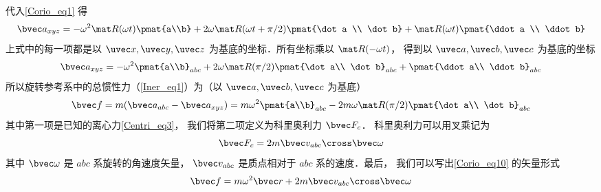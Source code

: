  代入\autoref{Corio_eq1} 得
\begin{equation}
\bvec a_{xyz} =
- \omega ^2 \mat R(\omega t)\pmat{a\\b} + 2\omega \mat R(\omega t + \pi /2)\pmat{\dot a \\ \dot b} + \mat R(\omega t)\pmat{\ddot a \\ \ddot b}
\end{equation}
上式中的每一项都是以 $\uvec x, \uvec y, \uvec z$ 为基底的坐标．所有坐标乘以 $\mat R(-\omega t)$， 得到以 $\uvec a, \uvec b, \uvec c$ 为基底的坐标
\begin{equation}
\bvec a_{xyz} =
- \omega^2 \pmat{a\\b}_{abc} + 2\omega \mat R(\pi /2)\pmat{\dot a\\ \dot b}_{abc} + \pmat{\ddot a\\ \ddot b}_{abc}
\end{equation}
所以旋转参考系中的总惯性力（\autoref{Iner_eq1}）为（以 $\uvec a, \uvec b, \uvec c$ 为基底）
\begin{equation}\label{Corio_eq10}
\bvec f = m(\bvec a_{abc} - \bvec a_{xyz})
=  m \omega ^2 \pmat{a\\b}_{abc} - 2m\omega \mat R(\pi /2)\pmat{\dot a\\ \dot b}_{abc}
\end{equation}
其中第一项是已知的离心力\autoref{Centri_eq3}， 我们将第二项定义为科里奥利力 $\bvec F_c$． 科里奥利力可以用叉乘记为
\begin{equation}
\bvec F_c = 2m \bvec v_{abc} \cross \bvec \omega
\end{equation}
其中 $\bvec\omega$ 是 $abc$ 系旋转的角速度矢量， $\bvec v_{abc}$ 是质点相对于 $abc$ 系的速度．最后， 我们可以写出\autoref{Corio_eq10} 的矢量形式
\begin{equation}
\bvec f = m \omega ^2 \bvec r + 2m \bvec v_{abc} \cross \bvec \omega 
\end{equation}
 




